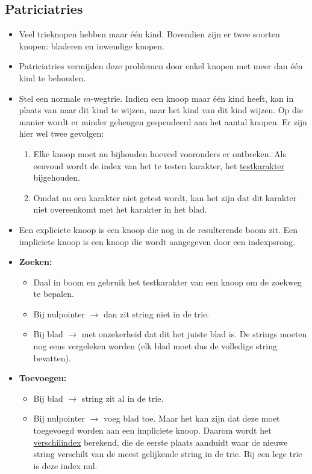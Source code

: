 \documentclass{report}
\begin{document}
\subsection{Patriciatries}
\begin{itemize}
	\item[\alert] Veel trieknopen hebben maar één kind. Bovendien zijn er twee soorten knopen: bladeren en inwendige knopen.
	\item[\good] Patriciatries vermijden deze problemen door enkel knopen met meer dan één kind te behouden.
	\item[\info] Stel een normale $m$-wegtrie. Indien een knoop maar één kind heeft, kan in plaats van naar dit kind te wijzen, naar het kind van dit kind wijzen. Op die manier wordt er minder geheugen gespendeerd aan het aantal knopen. Er zijn hier wel twee gevolgen:
	\begin{enumerate}
		\item Elke knoop moet nu bijhouden hoeveel voorouders er ontbreken. Als eenvoud wordt de index van het te testen karakter, het \underline{testkarakter} bijgehouden.
		\item Omdat nu een karakter niet getest wordt, kan het zijn dat dit karakter niet overeenkomt met het karakter in het blad.
	\end{enumerate}
	\item[\info] Een expliciete knoop is een knoop die nog in de resulterende boom zit. Een impliciete knoop is een knoop die wordt aangegeven door een indexpsrong.
	\item[\info] \textbf{Zoeken:} 
		\begin{itemize}
			\item Daal in boom en gebruik het testkarakter van een knoop om de zoekweg te bepalen.
			\item Bij nulpointer $\rightarrow$ dan zit string niet in de trie.
			\item Bij blad $\rightarrow$ met onzekerheid dat dit het juiste blad is. De strings moeten nog eens vergeleken worden (elk blad moet dus de volledige string bevatten).
		\end{itemize}
	\item[\info] \textbf{Toevoegen:}
		\begin{itemize}
			\item Bij blad $\rightarrow$ string zit al in de trie.
			\item Bij nulpointer $\rightarrow$ voeg blad toe. Maar het kan zijn dat deze moet toegevoegd worden aan een impliciete knoop. Daarom wordt het \underline{verschilindex} berekend, die de eerste plaats aanduidt waar de nieuwe string verschilt van de meest gelijkende string in de trie. Bij een lege trie is deze index nul.

\end{itemize}
\end{itemize}
\end{document}
